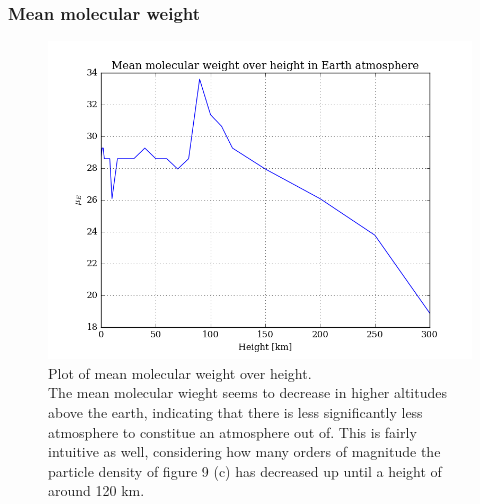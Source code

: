 \documentclass[11pt,a4paper,notitlepage]{article}
\begin{document}
\subsubsection{Mean molecular weight}
\begin{figure}[H]
\center

	\includegraphics[scale=0.42]{../figs/earth_meanmolweight.png}
	\caption{Plot of mean molecular weight over height.\\
	The mean molecular wieght seems to decrease in higher altitudes above the earth, indicating that there is less significantly less atmosphere to constitue an atmosphere out of. This is fairly intuitive as well, considering how many orders of magnitude the particle density of figure 9 (c) has decreased up until a height of around 120 km.}
\end{figure}
\end{document}

